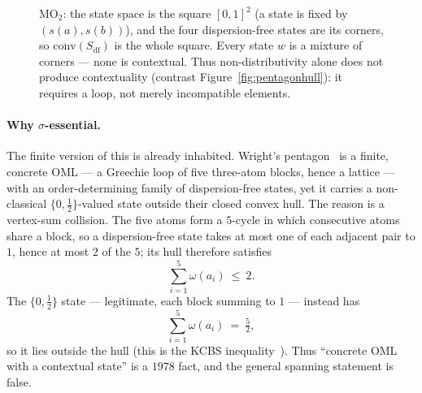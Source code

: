 \documentclass[11pt,reqno]{amsart}
\theoremstyle{plain}
\theoremstyle{definition}
\theoremstyle{remark}
\begin{document}
\begin{figure}[ht]
\centering
{}
\caption{$\mathrm{MO}_2$: the state space is the square $[0,1]^2$ (a state is fixed by
$(s(a),s(b))$), and the four dispersion-free states are its corners, so
$\overline{\mathrm{conv}}(S_{\mathrm{df}})$ is the whole square. Every state $w$ is a
mixture of corners --- none is contextual. Thus non-distributivity alone does not
produce contextuality (contrast Figure~\ref{fig:pentagonhull}): it requires a loop, not
merely incompatible elements.}
\label{fig:mo2hull}
\end{figure}

\paragraph{Why $\sigma$-essential.} The finite version of this is already inhabited.
Wright's pentagon~\cite{Wright1978} is a finite, concrete OML --- a Greechie loop of
five three-atom blocks, hence a lattice --- with an order-determining family of
dispersion-free states, yet it carries a non-classical $\{0,\tfrac12\}$-valued state
outside their closed convex hull. The reason is a vertex-sum collision. The five atoms
form a $5$-cycle in which consecutive atoms share a block, so a dispersion-free state
takes at most one of each adjacent pair to $1$, hence at most $2$ of the $5$; its hull
therefore satisfies
\[
  \textstyle\sum_{i=1}^5 \omega(a_i)\ \le\ 2 .
\]
The $\{0,\tfrac12\}$ state --- legitimate, each block summing to $1$ --- instead has
\[
  \textstyle\sum_{i=1}^5 \omega(a_i)\ =\ \tfrac52 ,
\]
so it lies outside the hull (this is the KCBS inequality~\cite{KCBS2008}). Thus
``concrete OML with a contextual state'' is a $1978$ fact, and the general spanning
statement is false.
\end{document}

